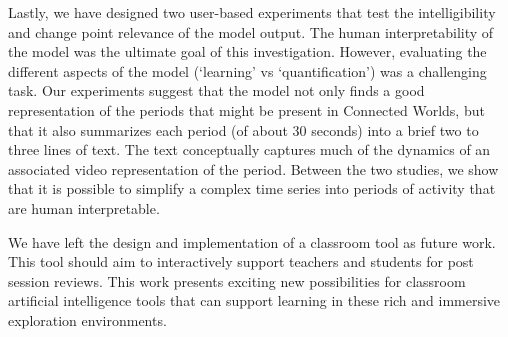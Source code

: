 Lastly, we have designed two user-based experiments that test the intelligibility and change point relevance of the model output. The human interpretability of the model was the ultimate goal of this investigation. However, evaluating the different aspects of the model (`learning' vs `quantification') was a challenging task. Our experiments suggest that the model not only finds a good representation of the periods that might be present in Connected Worlds, but that it also summarizes each period (of about 30 seconds) into a brief two to three lines of text. The text conceptually captures much of the dynamics of an associated video representation of the period. Between the two studies, we show that it is possible to simplify a complex time series into periods of activity that are human interpretable.

We have left the design and implementation of a classroom tool as future work. This tool should aim to interactively support teachers and students for post session reviews. This work presents exciting new possibilities for classroom artificial intelligence tools that can support learning in these rich and immersive exploration environments.
